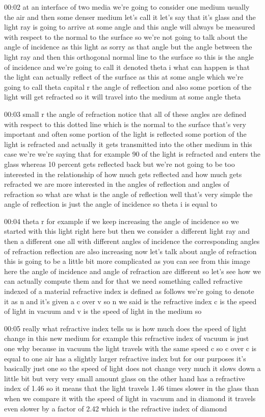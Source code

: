 00:02
at an interface of two media we're going to consider one medium
usually the air and then some denser medium
let's call it let's say that it's glass and the light ray is going to arrive at
some angle and this angle will always be measured
with respect to the normal to the surface so we're not going to talk about the
angle of incidence as this light as sorry as that angle but the angle
between the light ray and then this orthogonal normal
line to the surface so this is the angle of incidence
and we're going to call it denoted theta i what can happen is that the light can
actually reflect of the surface as this at some angle which we're going to call
theta capital r the angle of reflection and also some portion of the light will
get refracted so it will travel into the medium at some angle theta

00:03
small r the angle of refraction notice that all of these angles are
defined with respect to this dotted line which is the normal
to the surface that's very important and often some portion of the light is
reflected some portion of the light is refracted and actually it gets
transmitted into the other medium in this case we're we're saying that for
example 90 of the light is refracted and enters the glass
whereas 10 percent gets reflected back but we're not going to be too interested
in the relationship of how much gets reflected and how much gets refracted
we are more interested in the angles of reflection and angles of refraction
so what are what is the angle of reflection well that's very simple
the angle of reflection is just the angle of incidence so theta i is equal to

00:04
theta r for example if we keep increasing the angle of incidence so we started
with this light right here but then we consider a different light
ray and then a different one all with different angles of incidence
the corresponding angles of refraction reflection are also increasing
now let's talk about angle of refraction this is going to be a little bit more
complicated as you can see from this image here the angle of incidence and
angle of refraction are different so let's see how we can actually compute them
and for that we need something called refractive indexed of a material
refractive index is defined as follows we're going to denote it as n
and it's given a c over v so n we said is the refractive index c
is the speed of light in vacuum and v is the speed of light in the medium so

00:05
really what refractive index tells us is how much does the speed
of light change in this new medium for example this refractive index of vacuum
is just one why because in vacuum the light travels with the same speed c
so c over c is equal to one air has a slightly larger refractive index but
for our purposes it's basically just one so
the speed of light does not change very much it slows down a little bit
but very very small amount glass on the other hand
has a refractive index of 1.46 so it means that the light travels 1.46 times
slower in the glass than when we compare it with the
speed of light in vacuum and in diamond it travels
even slower by a factor of 2.42 which is the refractive index of diamond

